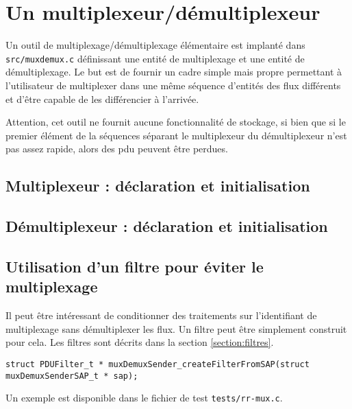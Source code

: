 %
\section{Un multiplexeur/démultiplexeur}
\label{section:muxdemux}

   Un outil de multiplexage/démultiplexage élémentaire est implanté
dans {\tt src/muxdemux.c} définissant une entité de multiplexage et
une entité de démultiplexage. Le but est de fournir un cadre simple
mais propre permettant à l'utilisateur de multiplexer dans une même
séquence d'entités des flux différents et d'\^etre capable de les
différencier à l'arrivée.

   Attention, cet outil ne fournit aucune fonctionnalité de stockage,
si bien que si le premier élément de la séquences séparant le
multiplexeur du démultiplexeur n'est pas assez rapide, alors des {\sc
  pdu} peuvent être perdues.


%
\subsection{Multiplexeur : déclaration et initialisation}

%
\subsection{Démultiplexeur : déclaration et initialisation}

%
\subsection{Utilisation d'un filtre pour éviter le multiplexage}

   Il peut être intéressant de conditionner des traitements sur
l'identifiant de multiplexage sans démultiplexer les flux. Un filtre
peut être simplement construit pour cela. Les filtres sont décrits
dans la section \ref{section:filtres}.

\begin{verbatim}
struct PDUFilter_t * muxDemuxSender_createFilterFromSAP(struct muxDemuxSenderSAP_t * sap);
\end{verbatim}

   Un exemple est disponible dans le fichier de test {\tt tests/rr-mux.c}.
